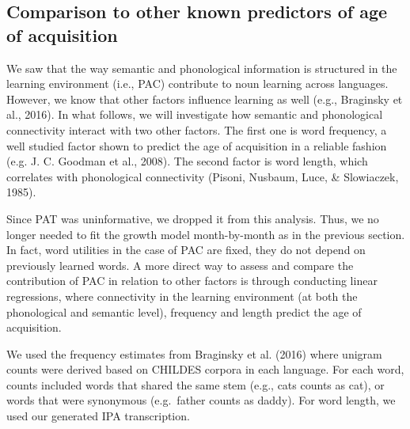 \documentclass[10pt, letterpaper]{article}
\begin{document}
\subsection{Comparison to other known predictors of age of
acquisition}\label{comparison-to-other-known-predictors-of-age-of-acquisition}

We saw that the way semantic and phonological information is structured
in the learning environment (i.e., PAC) contribute to noun learning
across languages. However, we know that other factors influence learning
as well (e.g., Braginsky et al., 2016). In what follows, we will
investigate how semantic and phonological connectivity interact with two
other factors. The first one is word frequency, a well studied factor
shown to predict the age of acquisition in a reliable fashion (e.g. J.
C. Goodman et al., 2008). The second factor is word length, which
correlates with phonological connectivity (Pisoni, Nusbaum, Luce, \&
Slowiaczek, 1985).

Since PAT was uninformative, we dropped it from this analysis. Thus, we
no longer needed to fit the growth model month-by-month as in the
previous section. In fact, word utilities in the case of PAC are fixed,
they do not depend on previously learned words. A more direct way to
assess and compare the contribution of PAC in relation to other factors
is through conducting linear regressions, where connectivity in the
learning environment (at both the phonological and semantic level),
frequency and length predict the age of acquisition.

We used the frequency estimates from Braginsky et al. (2016) where
unigram counts were derived based on CHILDES corpora in each language.
For each word, counts included words that shared the same stem (e.g.,
cats counts as cat), or words that were synonymous (e.g.~father counts
as daddy). For word length, we used our generated IPA transcription.
\end{document}
